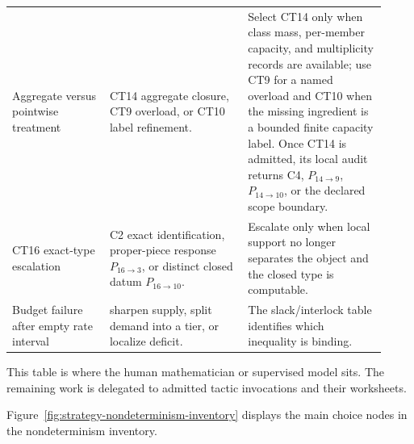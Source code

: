\documentclass[
  11pt,
]{article}
\theoremstyle{definition}
\begin{document}
\begin{longtable}[]{@{}
  >{\raggedright\arraybackslash}p{0.24\linewidth}
  >{\raggedright\arraybackslash}p{0.34\linewidth}
  >{\raggedright\arraybackslash}p{0.34\linewidth}@{}}
Aggregate versus pointwise treatment & CT14 aggregate closure, CT9 overload, or CT10 label refinement. & Select CT14 only when class mass, per-member capacity, and multiplicity records are available; use CT9 for a named overload and CT10 when the missing ingredient is a bounded finite capacity label.  Once CT14 is admitted, its local audit returns C4, \(P_{14\to9}\), \(P_{14\to10}\), or the declared scope boundary. \\
CT16 exact-type escalation & C2 exact identification, proper-piece response \(P_{16\to3}\), or distinct closed datum \(P_{16\to10}\). & Escalate only when local support no longer separates the object and the closed type is computable. \\
Budget failure after empty rate interval & sharpen supply, split demand into a tier, or localize deficit. & The slack/interlock table identifies which inequality is binding. \\
\end{longtable}
\endgroup

This table is where the human mathematician or supervised model sits.
The remaining work is delegated to admitted tactic invocations and their
worksheets.

Figure~\ref{fig:strategy-nondeterminism-inventory} displays the main
choice nodes in the nondeterminism inventory.
\end{document}
